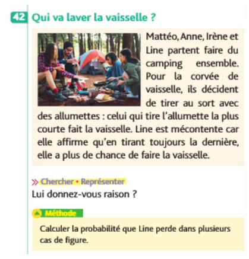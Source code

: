 \documentclass{article}
\begin{document}
\begin{center}
\includegraphics[width=0.8\textwidth]{Exercice_3.png}
\end{center}
\end{document}

